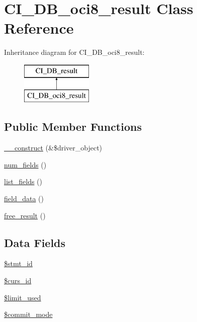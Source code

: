 \hypertarget{class_c_i___d_b__oci8__result}{}\section{C\+I\+\_\+\+D\+B\+\_\+oci8\+\_\+result Class Reference}
\label{class_c_i___d_b__oci8__result}
Inheritance diagram for C\+I\+\_\+\+D\+B\+\_\+oci8\+\_\+result\+:\begin{figure}[H]
\begin{center}
\leavevmode
\includegraphics[height=2.000000cm]{class_c_i___d_b__oci8__result}
\end{center}
\end{figure}
\subsection*{Public Member Functions}
\begin{DoxyCompactItemize}
\item 
\mbox{\hyperlink{class_c_i___d_b__oci8__result_a8e093c8b6e5733bc3f306385ee426ab7}{\+\_\+\+\_\+construct}} (\&\$driver\+\_\+object)
\item 
\mbox{\hyperlink{class_c_i___d_b__oci8__result_af831bf363e4d7d661a717a4932af449d}{num\+\_\+fields}} ()
\item 
\mbox{\hyperlink{class_c_i___d_b__oci8__result_a50b54eb4ea7cfd039740f532988ea776}{list\+\_\+fields}} ()
\item 
\mbox{\hyperlink{class_c_i___d_b__oci8__result_a84bffd65e53902ade1591716749a33e3}{field\+\_\+data}} ()
\item 
\mbox{\hyperlink{class_c_i___d_b__oci8__result_aad2d98d6beb3d6095405356c6107b473}{free\+\_\+result}} ()
\end{DoxyCompactItemize}
\subsection*{Data Fields}
\begin{DoxyCompactItemize}
\item 
\mbox{\hyperlink{class_c_i___d_b__oci8__result_a1a97f17fd259cd27c73b65e6c3706ec0}{\$stmt\+\_\+id}}
\item 
\mbox{\hyperlink{class_c_i___d_b__oci8__result_a75e7d18ad2e68ace3813533c9da2e179}{\$curs\+\_\+id}}
\item 
\mbox{\hyperlink{class_c_i___d_b__oci8__result_a96df35d7e3e76bef21ebb80234fe59e8}{\$limit\+\_\+used}}
\item 
\mbox{\hyperlink{class_c_i___d_b__oci8__result_a9b3b7163763603c5a0bcdfd819ae074d}{\$commit\+\_\+mode}}
\end{DoxyCompactItemize}
